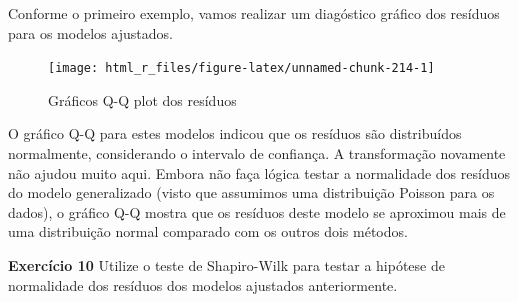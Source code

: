 \documentclass[
]{book}
\newenvironment{Shaded}{\begin{snugshade}}{\end{snugshade}}
\newcommand{\DataTypeTok}[1]{\textcolor[rgb]{0.13,0.29,0.53}{#1}}
\newcommand{\FloatTok}[1]{\textcolor[rgb]{0.00,0.00,0.81}{#1}}
\newcommand{\KeywordTok}[1]{\textcolor[rgb]{0.13,0.29,0.53}{\textbf{#1}}}
\newcommand{\NormalTok}[1]{#1}
\newcommand{\OperatorTok}[1]{\textcolor[rgb]{0.81,0.36,0.00}{\textbf{#1}}}
\newcommand{\StringTok}[1]{\textcolor[rgb]{0.31,0.60,0.02}{#1}}
\begin{document}
Conforme o primeiro exemplo, vamos realizar um diagóstico gráfico dos resíduos para os modelos ajustados.

\begin{Shaded}
\end{Shaded}

\begin{figure}

{\centering \texttt{[image: html\_r\_files/figure-latex/unnamed-chunk-214-1]} 

}

\caption{Gráficos Q-Q plot dos resíduos }\label{fig:unnamed-chunk-214}
\end{figure}

O gráfico Q-Q para estes modelos indicou que os resíduos são distribuídos normalmente, considerando o intervalo de confiança. A transformação novamente não ajudou muito aqui. Embora não faça lógica testar a normalidade dos resíduos do modelo generalizado (visto que assumimos uma distribuição Poisson para os dados), o gráfico Q-Q mostra que os resíduos deste modelo se aproximou mais de uma distribuição normal comparado com os outros dois métodos.

\begin{tarefa}
\textbf{Exercício 10}
Utilize o teste de Shapiro-Wilk para testar a hipótese de normalidade dos resíduos dos modelos ajustados anteriormente.
\end{tarefa}
\end{document}
